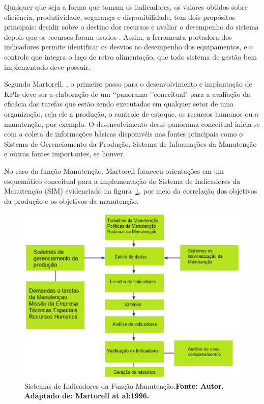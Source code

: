 Qualquer que seja a forma que tomam os indicadores, os valores obtidos sobre eficiência, produtividade, segurança e disponibilidade, tem dois propósitos principais: decidir sobre o destino dos recursos e avaliar o desempenho do sistema depois que os recursos foram usados \cite{lofsten1998}. Assim, a ferramenta portadora dos indicadores permite identificar os desvios no desempenho dos equipamentos, e o controle que integra o laço de retro alimentação, que todo sistema de gestão bem implementado deve possuir. 

Segundo Martorell, \cite{martorell1999}, o primeiro passo para o desenvolvimento e implantação de KPIs deve ser a elaboração de um \lq\lq panorama \rq\rq conceitual" para a avaliação da eficácia das tarefas que estão sendo executadas em qualquer setor de uma organização, seja ele a produção, o controle de estoque, os recursos humanos ou a manutenção, por exemplo. O desenvolvimento desse panorama conceitual inicia-se com a coleta de informações básicas disponivéis nas fontes principais como o Sistema de Gerenciamento da Produção, Sistema de Informações da Manutenção e outras fontes importantes, se houver.

No caso da função Manutenção, Martorell forneceu orientações em um esquemático conceitual para a implementação do Sistema de Indicadores da Manutenção (SIM) evidenciado na figura~\ref{Sistemas de Indicadores da Manutencao}, por meio da correlação dos objetivos da produção e os objetivos da manutenção.

\graphicspath{{figuras/}}
\begin{figure}[H]
\centering
\includegraphics[width=1\textwidth]{Sistemas_de_Indicadores_da_Manuten_o.eps}
\caption{Sistemas de Indicadores da Função Manutenção.\textbf{Fonte: Autor. Adaptado de: Martorell at al:1996.}}
\label{Sistemas de Indicadores da Manutencao}
\end{figure}

